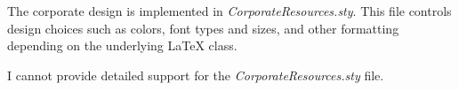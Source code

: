 The corporate design is implemented in \emph{CorporateResources.sty}. This file controls design choices such as colors, font types and sizes, and other formatting depending on the underlying LaTeX class.

I cannot provide detailed support for the \emph{CorporateResources.sty} file.
